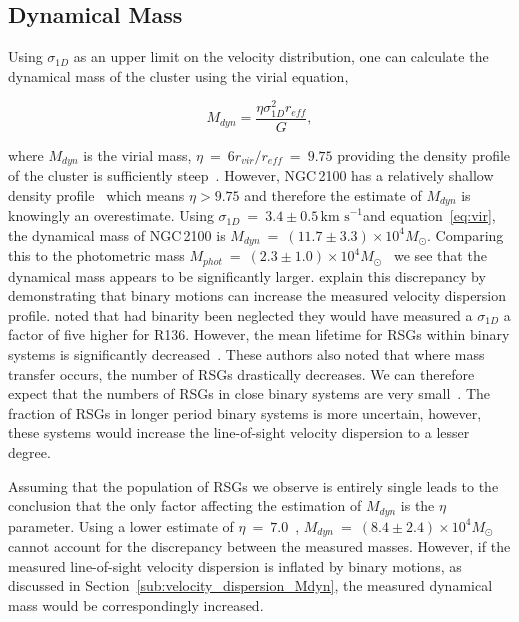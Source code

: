\documentclass[useAMS,usenatbib]{mn2e}
\def\kms{$\mbox{km s}^{-1}$}
\begin{document}

\subsection{Dynamical Mass} %
\label{sub:dynamical_mass}


Using $\sigma_{1D}$ as an upper limit on the velocity distribution, one can calculate the dynamical mass of the cluster using the virial equation,

\begin{equation}
  M_{dyn} = \frac{\eta\sigma_{1D}^{2}r_{eff}}{G},
  \label{eq:vir}
\end{equation}

\noindent where $M_{dyn}$ is the virial mass, $\eta~=~6r_{vir}/r_{eff}~=~9.75$ providing the density profile of the cluster is sufficiently steep~\citep{2010ARA&A..48..431P}.
However, NGC\,2100 has a relatively shallow density profile~\citep[$\gamma~=~2.44\pm0.14$;][]{2003MNRAS.338...85M} which means $\eta>9.75$ and therefore the estimate of $M_{dyn}$ is knowingly an overestimate.
Using $\sigma_{1D}~=~3.4\pm0.5$\,\kms and equation~\ref{eq:vir}, the dynamical mass of NGC\,2100 is $M_{dyn}~=~(11.7\pm3.3)\times 10^{4}M_{\odot}$.
Comparing this to the photometric mass $M_{phot}~=~(2.3\pm1.0)\times 10^{4}M_{\odot}$~\citep{2005ApJS..161..304M} we see that the dynamical mass appears to be significantly larger.
\citet{2010MNRAS.402.1750G} explain this discrepancy by demonstrating that binary motions can increase the measured velocity dispersion profile.
\citet{2012A&A...546A..73H} noted that had binarity been neglected they would have measured a $\sigma_{1D}$ a factor of five higher for R136.
However, the mean lifetime for RSGs within binary systems is significantly decreased~\citep{2008MNRAS.384.1109E}.
These authors also noted that where mass transfer occurs, the number of RSGs drastically decreases.
We can therefore expect that the numbers of RSGs in close binary systems are very small~\citep{2009ApJ...696.2014D}.
The fraction of RSGs in longer period binary systems is more uncertain, however, these systems would increase the line-of-sight velocity dispersion to a lesser degree.

Assuming that the population of RSGs we observe is entirely single leads to the conclusion that the only factor affecting the estimation of $M_{dyn}$ is the $\eta$ parameter.
Using a lower estimate of $\eta~=~7.0$~\citep[estimated from Fig. 4a in][]{2010ARA&A..48..431P}, $M_{dyn}~=~(8.4\pm2.4)\times 10^{4}M_{\odot}$ cannot account for the discrepancy between the measured masses.
However, if the measured line-of-sight velocity dispersion is inflated by binary motions, as discussed in Section~\ref{sub:velocity_dispersion_Mdyn}, the measured dynamical mass would be correspondingly increased.
\end{document}

